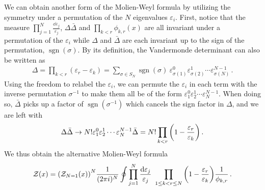 \documentclass[a4paper,11pt]{article}
\DeclareMathOperator{\sgn}{sgn}
\begin{document}
We can obtain another form of the Molien-Weyl formula by utilizing the symmetry under a permutation of the $N$ eigenvalues $\varepsilon_i$.
First, notice that the measure $\prod_{j=1}^N \frac{\dd \varepsilon_j}{\varepsilon_j}$, $\Delta\bar{\Delta}$ and $\prod_{k<r} \phi_{k,r}(x)$ are all invariant under a permutation of the $\varepsilon_i$ while $\Delta$ and $\bar{\Delta}$ are each invariant up to the sign of the permutation, $\sgn(\sigma)$.
% 
By its definition, the Vandermonde determinant can also be written as 
%
\begin{equation}
\begin{split}
	\Delta = \prod_{k<r} (\varepsilon_r-\varepsilon_k)
	= \sum_{\sigma\in S_N} \sgn(\sigma)\ \varepsilon_{\sigma(1)}^0\varepsilon_{\sigma(2)}^1 \cdots \varepsilon_{\sigma(N)}^{N-1}\,.
\end{split}
\end{equation}
% 
Using the freedom to relabel the $\varepsilon_i$, we can permute the $\varepsilon_i$ in each term with the inverse permutation $\sigma^{-1}$ to make them all be of the form $\varepsilon_{1}^0\varepsilon_{2}^1 \cdots \varepsilon_{N}^{N-1}$. When doing so, $\bar{\Delta}$ picks up a factor of $\sgn(\sigma^{-1})$ which cancels the sign factor in $\Delta$, and we are left with
% 
\begin{equation}
	\Delta\bar{\Delta} \to N! \varepsilon_{1}^0\varepsilon_{2}^1 \cdots \varepsilon_{N}^{N-1} \bar{\Delta} = N! \prod_{k<r} \qty(1-\frac{\varepsilon_r}{\varepsilon_k})\,.
\end{equation}
%
We thus obtain the alternative Molien-Weyl formula
%
\begin{equation}
\mathcal{Z}(x) = \qty(\mathcal{Z}_{N=1}(x))^N   \frac{1}{(2\pi i)^N} \oint \prod_{j=1}^N \frac{\dd \varepsilon_j}{\varepsilon_j} \ \prod_{1\leq k<r \leq N} \qty(1-\frac{\varepsilon_r}{\varepsilon_k}) \frac{1}{\phi_{k,r}}\,.
\end{equation}
\end{document}

